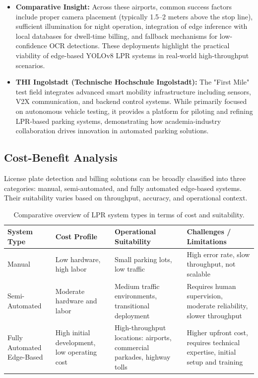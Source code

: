 \begin{itemize}
		\item \textbf{Comparative Insight:} Across these airports, common success factors include proper camera placement (typically 1.5–2 meters above the stop line), sufficient illumination for night operation, integration of edge inference with local databases for dwell-time billing, and fallback mechanisms for low-confidence OCR detections. These deployments highlight the practical viability of edge-based YOLOv8 LPR systems in real-world high-throughput scenarios.
		
		\item \textbf{THI Ingolstadt (Technische Hochschule Ingolstadt):} The "First Mile" test field integrates advanced smart mobility infrastructure including sensors, V2X communication, and backend control systems. While primarily focused on autonomous vehicle testing, it provides a platform for piloting and refining LPR-based parking systems, demonstrating how academia-industry collaboration drives innovation in automated parking solutions.
		
	\end{itemize}
	
	\subsection{Cost-Benefit Analysis}
	
	License plate detection and billing solutions can be broadly classified into three categories: manual, semi-automated, and fully automated edge-based systems. Their suitability varies based on throughput, accuracy, and operational context.
	
	\begin{table}[h!]
		\centering
		\begin{tabular}{|l|l|l|l|}
			\hline
			\textbf{System Type} & \textbf{Cost Profile} & \textbf{Operational Suitability} & \textbf{Challenges / Limitations} \\
			\hline
			Manual & Low hardware, high labor & Small parking lots, low traffic & High error rate, slow throughput, not scalable \\
			\hline
			Semi-Automated & Moderate hardware and labor & Medium traffic environments, transitional deployment & Requires human supervision, moderate reliability, slower throughput \\
			\hline
			Fully Automated Edge-Based & High initial development, low operating cost & High-throughput locations: airports, commercial parkades, highway tolls & Higher upfront cost, requires technical expertise, initial setup and training \\
			\hline
		\end{tabular}
		\caption{Comparative overview of LPR system types in terms of cost and suitability.}
	\end{table}
	
